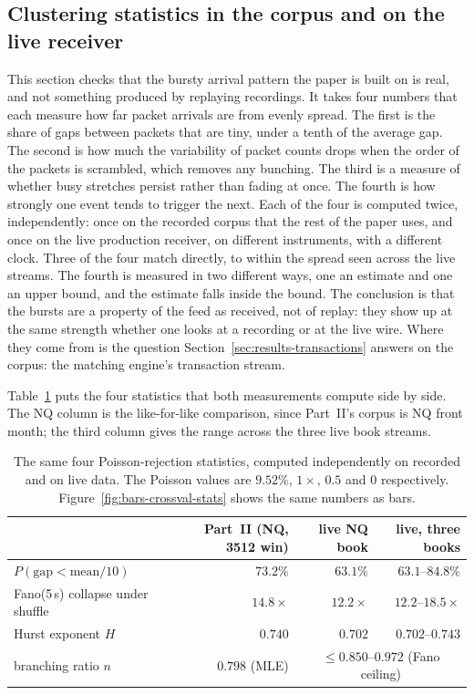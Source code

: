\documentclass[11pt]{article}
\begin{document}
\subsection{Clustering statistics in the corpus and on the live receiver}
\label{sec:crossval-agree}

This section checks that the bursty arrival pattern the paper is built on is real, and
not something produced by replaying recordings. It takes four numbers that each measure
how far packet arrivals are from evenly spread. The first is the share of gaps between
packets that are tiny, under a tenth of the average gap. The second is how much the
variability of packet counts drops when the order of the packets is scrambled, which
removes any bunching. The third is a measure of whether busy stretches persist rather
than fading at once. The fourth is how strongly one event tends to trigger the next.
Each of the four is computed twice, independently: once on the recorded corpus that the
rest of the paper uses, and once on the live production receiver, on different instruments, with a different clock. Three of the four match directly, to
within the spread seen across the live streams. The fourth is measured in two different
ways, one an estimate and one an upper bound, and the estimate falls inside the bound.
The conclusion is that the bursts are a property of the feed as received, not of
replay: they show up at the same strength whether one looks at a recording or at the
live wire. Where they come from is the question Section~\ref{sec:results-transactions}
answers on the corpus: the matching engine's transaction stream.

Table~\ref{tab:crossval-stats} puts the four statistics that both measurements compute
side by side. The NQ column is the like-for-like comparison, since Part~II's corpus is NQ
front month; the third column gives the range across the three live book streams.

\begin{table}[H]
\centering
\small
\begin{tabular}{@{}lrrr@{}}
\toprule
 & Part~II (NQ, 3512 win) & live NQ book & live, three books \\
\midrule
$P(\text{gap} < \text{mean}/10)$      & $73.2\%$ & $63.1\%$ & $63.1$--$84.8\%$ \\
Fano(5\,s) collapse under shuffle     & $14.8\times$ & $12.2\times$ & $12.2$--$18.5\times$ \\
Hurst exponent $H$                    & $0.740$ & $0.702$ & $0.702$--$0.743$ \\
branching ratio $n$                   & $0.798$ (MLE) & \multicolumn{2}{c}{$\le 0.850$--$0.972$ (Fano ceiling)} \\
\bottomrule
\end{tabular}
\caption{The same four Poisson-rejection statistics, computed independently on recorded
and on live data. The Poisson values are $9.52\%$, $1\times$, $0.5$ and $0$ respectively. Figure~\ref{fig:bars-crossval-stats} shows the same numbers as bars.}
\label{tab:crossval-stats}
\end{table}
\end{document}
